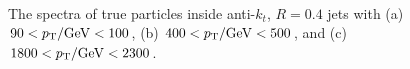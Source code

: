 \begin{figure}[ht]
\centering
{}
\\
\caption{The spectra of true particles inside anti-$k_t$, $R=0.4$ jets with (a) $90<p_{\mathrm{T}}/\mathrm{Ge\kern -0.05em V}<100$, (b) $400<p_{\mathrm{T}}/\mathrm{Ge\kern -0.05em V}<500$, and (c) $1800<p_{\mathrm{T}}/\mathrm{Ge\kern -0.05em V}<2300$.}
\label{fig:particle_spectra}
\end{figure}

